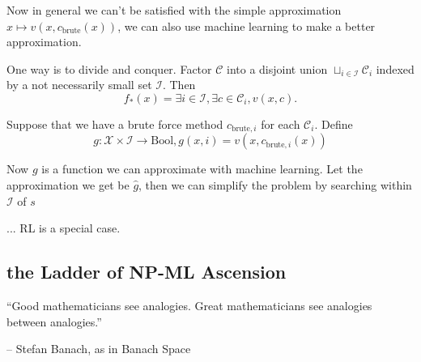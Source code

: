 \documentclass[11pt, oneside]{article}   	%
\theoremstyle{definition}
\begin{document}
Now in general we can't be satisfied with the simple approximation $x\mapsto v(x,c_{\text{brute}}(x))$, we can also use machine learning to make a better approximation.

One way is to divide and conquer. Factor $\mathcal{C}$ into a disjoint union $\sqcup_{i\in \mathcal{I}} \mathcal{C}_{i}$ indexed by a not necessarily small set $\mathcal{I}$. Then
\begin{equation}
	f_*(x)=\exists i\in \mathcal{I}, \exists c\in \mathcal{C}_i, v(x,c).
\end{equation}

Suppose that we have a brute force method $c_{\text{brute},i}$ for each $\mathcal{C}_i$. Define
\begin{equation}
	g: \mathcal{X}\times \mathcal{I} \rightarrow \text{Bool}, g(x, i) = v(x, c_{\text{brute},i}(x))
\end{equation}

Now $g$ is a function we can approximate with machine learning. Let the approximation we get be $\hat{g}$, then we can simplify the problem by searching within $\mathcal{I}$ of $s$

... RL is a special case.

\subsection{the Ladder of NP-ML Ascension}
``Good mathematicians see analogies. Great mathematicians see analogies between analogies.''

\hfill -- Stefan Banach, as in Banach Space


\begin{center}
\end{center}
\end{document}
